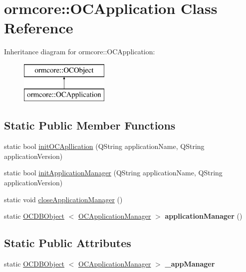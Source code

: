 \hypertarget{classormcore_1_1_o_c_application}{
\section{ormcore\-:\-:\-O\-C\-Application \-Class \-Reference}
\label{classormcore_1_1_o_c_application}
}
\-Inheritance diagram for ormcore\-:\-:\-O\-C\-Application\-:\begin{figure}[H]
\begin{center}
\leavevmode
\includegraphics[height=2.000000cm]{classormcore_1_1_o_c_application}
\end{center}
\end{figure}
\subsection*{\-Static \-Public \-Member \-Functions}
\begin{DoxyCompactItemize}
\item 
static bool \hyperlink{classormcore_1_1_o_c_application_a6fe0a11cab9afaa519316e038543341a}{init\-O\-C\-Apllication} (\-Q\-String application\-Name, \-Q\-String application\-Version)
\item 
static bool \hyperlink{classormcore_1_1_o_c_application_a23d0ff096f802d612d589ab93f340d78}{init\-Application\-Manager} (\-Q\-String application\-Name, \-Q\-String application\-Version)
\item 
static void \hyperlink{classormcore_1_1_o_c_application_aa6aa8b5f90f1744c23f968a3f71feab6}{close\-Application\-Manager} ()
\item 
\hypertarget{classormcore_1_1_o_c_application_aa1685b6ed517ac2c13a6232bb0ec7e6f}{
static \hyperlink{classormcore_1_1_o_c_d_b_object}{\-O\-C\-D\-B\-Object}\*
$<$ \hyperlink{classormcore_1_1_o_c_application_manager}{\-O\-C\-Application\-Manager} $>$ {\bfseries application\-Manager} ()}
\label{classormcore_1_1_o_c_application_aa1685b6ed517ac2c13a6232bb0ec7e6f}

\end{DoxyCompactItemize}
\subsection*{\-Static \-Public \-Attributes}
\begin{DoxyCompactItemize}
\item 
\hypertarget{classormcore_1_1_o_c_application_a3c3ae7e118f126824c8c04ca2549764f}{
static \hyperlink{classormcore_1_1_o_c_d_b_object}{\-O\-C\-D\-B\-Object}\*
$<$ \hyperlink{classormcore_1_1_o_c_application_manager}{\-O\-C\-Application\-Manager} $>$ {\bfseries \-\_\-app\-Manager}}
\label{classormcore_1_1_o_c_application_a3c3ae7e118f126824c8c04ca2549764f}

\end{DoxyCompactItemize}


